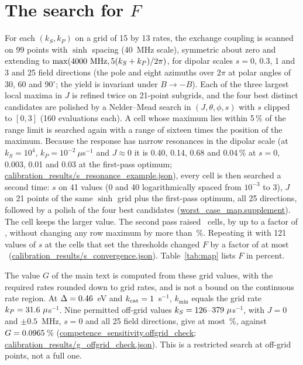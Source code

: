 \documentclass[11pt]{article}
\begin{document}
\section{The search for $F$}
For each $(k_S,k_P)$ on a grid of 15 by 13 rates, the exchange coupling is
scanned on 99 points with $\sinh$ spacing (40~MHz scale), symmetric about zero
and extending to $\max(4000~{\rm MHz},5(k_S+k_P)/2\pi)$, for dipolar scales
$s = 0$, 0.3, 1 and 3 and 25 field directions (the pole and eight azimuths over
$2\pi$ at polar angles of 30, 60 and 90$^\circ$; the yield is invariant under
$B\to-B$). Each of the three largest local maxima in $J$ is refined twice on
21-point subgrids, and the four best distinct candidates are polished by a
Nelder--Mead search in $(J,\theta,\phi,s)$ with $s$ clipped to $[0,3]$ (160
evaluations each). A cell whose maximum lies within 5\,\% of the range limit is
searched again with a range of sixteen times the position of the maximum.
Because the response has narrow resonances in the dipolar scale (at
$k_S = 10^4$, $k_P = 10^{-2}~\mu$s$^{-1}$ and $J\approx0$ it is 0.40, 0.14, 0.68
and 0.04\,\% at $s = 0$, 0.003, 0.01 and 0.03 at the first-pass optimum;
\url{calibration_results/s_resonance_example.json}), every cell is then searched a
second time: $s$ on 41 values (0 and 40 logarithmically spaced from $10^{-3}$ to
3), $J$ on 21 points of the same $\sinh$ grid plus the first-pass optimum, all
25 directions, followed by a polish of the four best candidates
(\url{worst_case_map.supplement}). The cell keeps the larger value.
The second pass raised \nSuppRaised\ cells, by up to a factor of
\suppMaxRatio, without changing any row maximum by more than
\rowMaxChange\,\%. Repeating it with 121 values of $s$ at the cells that
set the thresholds changed $F$ by a factor of at most \convMaxRatio\
(\url{calibration_results/s_convergence.json}). Table~\ref{tab:map}
lists $F$ in percent.

The value $G$ of the main text is computed from these grid values, with the
required rates rounded down to grid rates, and is not a bound on the continuous
rate region. At $\Delta=0.46$~eV and $k_{\rm cat}=1$~s$^{-1}$, $k_{\min}$
equals the grid rate $k_P=31.6~\mu$s$^{-1}$. Nine permitted off-grid values
$k_S=126$--$379~\mu$s$^{-1}$, with $J = 0$ and $\pm0.5$~MHz, $s=0$ and
all 25 field directions, give at most \offMax\,\%, against $G=0.0965$\,\%
(\url{competence_sensitivity.offgrid_check};
\url{calibration_results/g_offgrid_check.json}). This is a restricted search at
off-grid points, not a full one.
\end{document}
